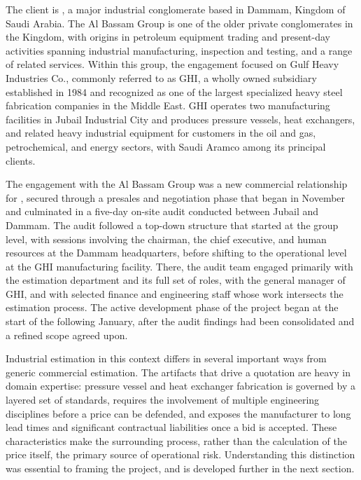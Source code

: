 The client is \clientCompany, a major industrial conglomerate based in Dammam, Kingdom of Saudi Arabia. The Al Bassam Group is one of the older private conglomerates in the Kingdom, with origins in petroleum equipment trading and present-day activities spanning industrial manufacturing, inspection and testing, and a range of related services. Within this group, the engagement focused on Gulf Heavy Industries Co., commonly referred to as GHI, a wholly owned subsidiary established in 1984 and recognized as one of the largest specialized heavy steel fabrication companies in the Middle East. GHI operates two manufacturing facilities in Jubail Industrial City and produces pressure vessels, heat exchangers, and related heavy industrial equipment for customers in the oil and gas, petrochemical, and energy sectors, with Saudi Aramco among its principal clients.

The engagement with the Al Bassam Group was a new commercial relationship for \hostCompany, secured through a presales and negotiation phase that began in November and culminated in a five-day on-site audit conducted between Jubail and Dammam. The audit followed a top-down structure that started at the group level, with sessions involving the chairman, the chief executive, and human resources at the Dammam headquarters, before shifting to the operational level at the GHI manufacturing facility. There, the audit team engaged primarily with the estimation department and its full set of roles, with the general manager of GHI, and with selected finance and engineering staff whose work intersects the estimation process. The active development phase of the project began at the start of the following January, after the audit findings had been consolidated and a refined scope agreed upon.

Industrial estimation in this context differs in several important ways from generic commercial estimation. The artifacts that drive a quotation are heavy in domain expertise: pressure vessel and heat exchanger fabrication is governed by a layered set of standards, requires the involvement of multiple engineering disciplines before a price can be defended, and exposes the manufacturer to long lead times and significant contractual liabilities once a bid is accepted. These characteristics make the surrounding process, rather than the calculation of the price itself, the primary source of operational risk. Understanding this distinction was essential to framing the project, and is developed further in the next section.

